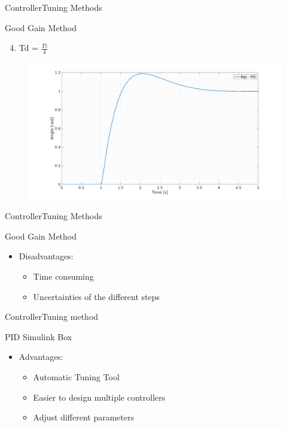 \begin{frame}{Controller}{Tuning Methods}
  \begin{block}{Good Gain Method}
  
	  \begin{enumerate}
	  \setcounter{enumi}{3}
	  	\item Td = $\frac{Ti}{4}$
	  \end{enumerate}
	  \begin{figure}
       \includegraphics[scale=0.20]{../report/figures/GG4.png}
      \end{figure}
  
  \end{block}
\end{frame}


\begin{frame}{Controller}{Tuning Methods}
  \begin{block}{Good Gain Method}
  
	 \begin{itemize}
	  	\item Disadvantages:
	  \begin{itemize}
	  	\item Time consuming
	  	\item Uncertainties of the different steps	  	
	  \end{itemize}
	\end{itemize}
  
  \end{block}
\end{frame}


\begin{frame}{Controller}{Tuning method}
  \begin{block}{PID Simulink Box}

	  \begin{itemize}
	  \item Advantages:
	  \begin{itemize}
	  	\item Automatic Tuning Tool
	  	\item Easier to design multiple controllers
	  	\item Adjust different parameters  	
	  \end{itemize}
	  \end{itemize}

  \end{block}
\end{frame}

